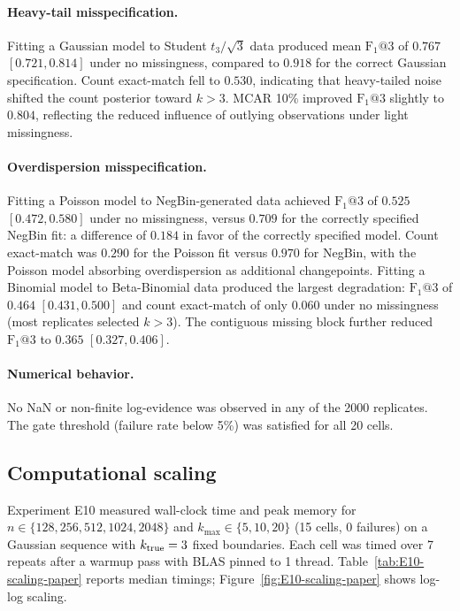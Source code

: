 \paragraph{Heavy-tail misspecification.}
Fitting a Gaussian model to Student $t_3/\sqrt{3}$ data produced mean
$\mathrm{F}_1@3$ of $0.767$ $[0.721, 0.814]$ under no missingness, compared
to $0.918$ for the correct Gaussian specification.
Count exact-match fell to $0.530$, indicating that heavy-tailed noise
shifted the count posterior toward $k>3$.
MCAR 10\% improved $\mathrm{F}_1@3$ slightly to $0.804$,
reflecting the reduced influence of outlying observations under light missingness.

\paragraph{Overdispersion misspecification.}
Fitting a Poisson model to NegBin-generated data achieved $\mathrm{F}_1@3$
of $0.525$ $[0.472, 0.580]$ under no missingness, versus $0.709$ for the
correctly specified NegBin fit: a difference of $0.184$ in favor of the
correctly specified model.
Count exact-match was $0.290$ for the Poisson fit versus $0.970$ for NegBin,
with the Poisson model absorbing overdispersion as additional changepoints.
Fitting a Binomial model to Beta-Binomial data produced the largest
degradation: $\mathrm{F}_1@3$ of $0.464$ $[0.431, 0.500]$ and count
exact-match of only $0.060$ under no missingness (most replicates selected
$k>3$). The contiguous missing block further reduced $\mathrm{F}_1@3$ to
$0.365$ $[0.327, 0.406]$.

\paragraph{Numerical behavior.}
No NaN or non-finite log-evidence was observed in any of the 2000 replicates.
The gate threshold (failure rate below 5\%) was satisfied for all 20 cells.





\FloatBarrier
\subsection{Computational scaling}
\label{sec:e10}
Experiment E10 measured wall-clock time and peak memory for $n\in\{128,256,512,1024,2048\}$ and $k_{\max}\in\{5,10,20\}$ (15 cells, 0 failures) on a Gaussian sequence with $k_{\rm true}=3$ fixed boundaries. Each cell was timed over 7 repeats after a warmup pass with BLAS pinned to 1 thread. Table~\ref{tab:E10-scaling-paper} reports median timings; Figure~\ref{fig:E10-scaling-paper} shows log-log scaling.

